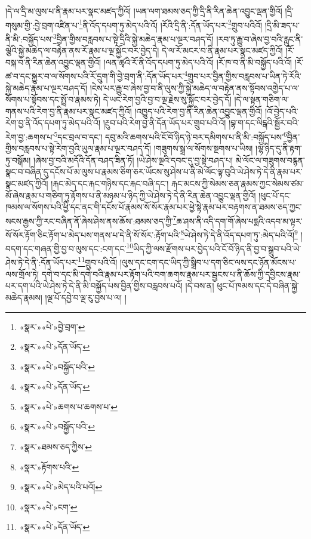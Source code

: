 །དེ་ལ་དྲི་མ་ལུས་པ་ནི་རྣམ་པར་སྣང་མཛད་ཀྱིའོ། །ཡན་ལག་ཐམས་ཅད་ཀྱི་དྲི་ནི་རིན་ཆེན་འབྱུང་ལྡན་གྱིའོ། །དྲི་གསུམ་གྱི་:བྱེ་བྲག་འཛིན་པ་\footnote{«སྣར་»«པེ་»བྱེ་བྲག་}ནི་འོད་དཔག་ཏུ་མེད་པའི་འོ། །རོའི་དྲི་ནི་:དོན་ཡོད་པར་\footnote{«སྣར་»«པེ་»དོན་ཡོད་}གྲུབ་པའིའོ། །དྲི་མི་ཟད་པ་ནི་མི་:བསྐྱོད་པས་\footnote{«སྣར་»«པེ་»བསྐྱོད་པའི་}བྱིན་གྱིས་བརླབས་པ་སྟེ་དྲིའི་སྐྱེ་མཆེད་རྣམ་པ་ལྔར་བཤད་དོ། །རབ་ཏུ་རྒྱུ་བ་ཞེས་བྱ་བའི་རླུང་ནི་ལྕེའི་སྐྱེ་མཆེད་ལ་བརྟེན་ནས་རོ་རྣམ་པ་ལྔ་སྐྱོང་བར་བྱེད་དེ། དེ་ལ་རོ་མངར་བ་ནི་རྣམ་པར་སྣང་མཛད་ཀྱིའོ། །རོ་བསྐ་བ་ནི་རིན་ཆེན་འབྱུང་ལྡན་གྱིའོ། །ལན་ཚྭའི་རོ་ནི་འོད་དཔག་ཏུ་མེད་པའི་འོ། །རོ་ཁ་བ་ནི་མི་བསྐྱོད་པའི་འོ། །རོ་ཚ་བ་དང་སྐྱུར་བ་ལ་སོགས་པའི་རོ་དྲུག་གི་བྱེ་བྲག་ནི་:དོན་ཡོད་པར་\footnote{«སྣར་»«པེ་»དོན་ཡོད་}གྲུབ་པར་བྱིན་གྱིས་བརླབས་པ་ཡིན་ཏེ་རོའི་སྐྱེ་མཆེད་རྣམ་པ་ལྔར་བཤད་དོ། །ངེས་པར་རྒྱུ་བ་ཞེས་བྱ་བ་ནི་ལུས་ཀྱི་སྐྱེ་མཆེད་ལ་བརྟེན་ནས་སྟོབས་འགྱེད་པ་ལ་སོགས་པ་སྟོབས་དང་སྤྲོ་བ་རྣམས་ཏེ། དེ་ཡང་རེག་བྱའི་བྱ་བ་ལྔ་རྗེས་སུ་སྐྱོང་བར་བྱེད་དོ། །དེ་ལ་སྟན་གཅིག་ལ་གནས་པའི་རེག་བྱ་ནི་རྣམ་པར་སྣང་མཛད་ཀྱིའོ། །འཁྱུད་པའི་རེག་བྱ་ནི་རིན་ཆེན་འབྱུང་ལྡན་གྱིའོ། །འོ་བྱེད་པའི་རེག་བྱ་ནི་འོད་དཔག་ཏུ་མེད་པའི་འོ། །རྔུབ་པའི་རེག་བྱ་ནི་དོན་ཡོད་པར་གྲུབ་པའི་འོ། །བྷ་ག་དང་ལིངྒའི་སྦྱོར་བའི་རེག་བྱ་:ཆགས་པ་\footnote{«སྣར་»«པེ་»ཆགས་པ་ཆགས་པ་}དང་བྲལ་བ་དང་། དབུ་མའི་ཆགས་པའི་ངོ་བོ་ཉིད་ཉེ་བར་དམིགས་པ་ནི་མི་:བསྐྱོད་པས་\footnote{«སྣར་»«པེ་»བསྐྱོད་པའི་}བྱིན་གྱིས་བརླབས་པ་སྟེ་རེག་བྱའི་ཡུལ་རྣམ་པ་ལྔར་བཤད་དོ། །གཟུགས་སྒྲ་ལ་སོགས་སྔགས་པ་ཡིས། །ལྷ་ཉིད་དུ་ནི་རྟག་ཏུ་བསྒོམ། །ཞེས་བྱ་བའི་མདོའི་དོན་བཤད་ཟིན་ཏོ། །ཡེ་ཤེས་ལྔའི་དབང་དུ་བྱ་སྟེ་བཤད་པ། མེ་ལོང་ལ་གཟུགས་བརྙན་སྣང་བ་བཞིན་དུ་དངོས་པོ་མ་ལུས་པ་རྣམས་ཅིག་ཅར་ཡོངས་སུ་ཤེས་པ་ནི་མེ་ལོང་ལྟ་བུའི་ཡེ་ཤེས་ཏེ་དེ་ནི་རྣམ་པར་སྣང་མཛད་ཀྱིའོ། །རྐང་མེད་དང་རྐང་གཉིས་དང་རྐང་བཞི་དང་། རྐང་མངས་ཀྱི་སེམས་ཅན་རྣམས་ཀྱང་སེམས་ཙམ་མོ་ཞེས་རྣམ་པ་གཅིག་ཏུ་རྟོགས་པ་ནི་མཉམ་པ་ཉིད་ཀྱི་ཡེ་ཤེས་ཏེ་དེ་ནི་རིན་ཆེན་འབྱུང་ལྡན་གྱིའོ། །ཕུང་པོ་དང་ཁམས་ལ་སོགས་པའི་ཕྱི་དང་ནང་གི་དངོས་པོ་རྣམས་སོ་སོར་རྣམ་པར་ཕྱེ་སྟེ་རྣམ་པར་བརྟགས་ན་ཐམས་ཅད་ཀྱང་སངས་རྒྱས་ཀྱི་རང་བཞིན་ནོ་ཞེས་ཤེས་ནས་ཆོས་:ཐམས་ཅད་ཀྱི་\footnote{«སྣར་»ཐམས་ཅད་ཀྱིས་}ཆ་ཤས་ནི་འདི་དག་གོ་ཞེས་པདྨའི་འདབ་མ་ལྟར་སོ་སོར་རྟོག་ཅིང་རྟོག་པ་མེད་པས་གནས་པ་དེ་ནི་སོ་སོར་:རྟོག་པའི་\footnote{«སྣར་»རྟོགས་པའི་}ཡེ་ཤེས་ཏེ་དེ་ནི་འོད་དཔག་ཏུ་:མེད་པའི་འོ།\footnote{«སྣར་»«པེ་»མེད་པའི་པའོ།} །བདག་དང་གཞན་གྱི་བྱ་བ་ལུས་དང་:ངག་དང་\footnote{«སྣར་»«པེ་»ངག་}ཡིད་ཀྱི་ལས་རྫོགས་པར་བྱེད་པའི་ངོ་བོ་ཉིད་ནི་བྱ་བ་སྒྲུབ་པའི་ཡེ་ཤེས་ཏེ་དེ་ནི་:དོན་ཡོད་པར་\footnote{«སྣར་»«པེ་»དོན་ཡོད་}གྲུབ་པའི་འོ། །ལུས་དང་ངག་དང་ཡིད་ཀྱི་སྒྲིབ་པ་དག་ཅིང་ལས་དང་ཉོན་མོངས་པ་ལས་གྲོལ་ཏེ། དགེ་བ་དང་མི་དགེ་བའི་རྣམ་པར་རྟོག་པའི་བག་ཆགས་རྣམ་པར་སྦྱངས་པ་ནི་ཆོས་ཀྱི་དབྱིངས་རྣམ་པར་དག་པའི་ཡེ་ཤེས་ཏེ་དེ་ནི་མི་བསྐྱོད་པས་བྱིན་གྱིས་བརླབས་པའོ། །དེ་བས་ན། ཕུང་པོ་ཁམས་དང་དེ་བཞིན་སྐྱེ་མཆེད་རྣམས། །ལྔ་པོ་དབྱེ་བ་ལྔ་རུ་བྱས་པ་ལ། །
